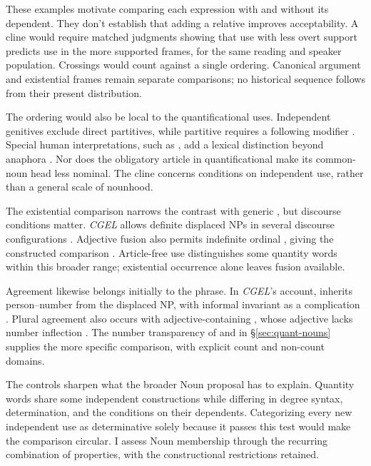 \documentclass[12pt]{article}
\begin{document}
These examples motivate comparing each expression with and without its dependent. They don't establish that adding a relative improves acceptability. A cline would require matched judgments showing that use with less overt support predicts use in the more supported frames, for the same reading and speaker population. Crossings would count against a single ordering. Canonical argument and existential frames remain separate comparisons; no historical sequence follows from their present distribution.

The ordering would also be local to the quantificational uses. Independent genitives exclude direct partitives, while partitive  requires a following modifier \citep[413]{huddleston2002}. Special human interpretations, such as , add a lexical distinction beyond anaphora \citep[414]{huddleston2002}. Nor does the obligatory article in quantificational  make its common-noun head less nominal. The cline concerns conditions on independent use, rather than a general scale of nounhood.

The existential comparison narrows the contrast with generic , but discourse conditions matter. \textit{CGEL} allows definite displaced NPs in several discourse configurations \citep[1397--1401]{huddleston2002}. Adjective fusion also permits indefinite ordinal  \citep[416]{huddleston2002}, giving the constructed comparison . Article-free use distinguishes some quantity words within this broader range; existential occurrence alone leaves fusion available.

Agreement likewise belongs initially to the phrase. In \textit{CGEL}'s account,  inherits person--number from the displaced NP, with informal invariant  as a complication \citep[242]{huddleston2002}. Plural agreement also occurs with adjective-containing , whose adjective lacks number inflection \citep[418]{huddleston2002}. The number transparency of  and  in §\ref{sec:quant-nouns} supplies the more specific comparison, with explicit count and non-count domains.

The controls sharpen what the broader Noun proposal has to explain. Quantity words share some independent constructions while differing in degree syntax, determination, and the conditions on their dependents. Categorizing every new independent use as determinative solely because it passes this test would make the comparison circular. I assess Noun membership through the recurring combination of properties, with the constructional restrictions retained.
\end{document}
